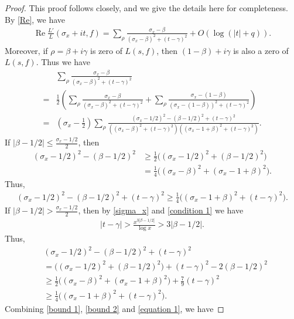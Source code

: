 \documentclass[11pt,reqno]{amsart}
\newcommand{\bea}{\begin{eqnarray}}
\newcommand{\eea}{\end{eqnarray}}
\newcommand{\bna}{\begin{eqnarray*}}
\newcommand{\ena}{\end{eqnarray*}}
\numberwithin{equation}{section}
\theoremstyle{plain}
\theoremstyle{definition}
\renewcommand{\Re}{\operatorname{Re}}
\begin{document}
\begin{proof}
This proof follows \cite[Lemma 4.3]{LS} closely, and we give the details here for completeness.
By \eqref{Re}, we have
\bea\label{Re sigma_x}
\Re\frac{L'}{L}(\sigma_x+it,f)=\sum_\rho\frac{\sigma_x-\beta}{(\sigma_x-\beta)^2+(t-\gamma)^2}+O(\log(|t|+q)).
\eea
Moreover, if $\rho=\beta+i\gamma$ is zero of $L(s,f)$, then $(1-\beta)+i\gamma$ is also a zero of $L(s,f)$.
Thus we have
\begin{equation}\label{equation 1}
\begin{split}
&\sum_\rho\frac{\sigma_x-\beta}{(\sigma_x-\beta)^2+(t-\gamma)^2}\\
=&\frac{1}{2}\left(\sum_\rho\frac{\sigma_x-\beta}{(\sigma_x-\beta)^2+(t-\gamma)^2}
+\sum_\rho\frac{\sigma_x-(1-\beta)}{(\sigma_x-(1-\beta))^2+(t-\gamma)^2}\right)\\
=&\left(\sigma_x-\frac{1}{2}\right)\sum_\rho\frac{(\sigma_x-1/2)^2-(\beta-1/2)^2+(t-\gamma)^2}
{((\sigma_x-\beta)^2+(t-\gamma)^2)((\sigma_x-1+\beta)^2+(t-\gamma)^2)}.
\end{split}
\end{equation}
If $|\beta-1/2|\leq \frac{\sigma_x-1/2}{2}$, then
\begin{equation*}
\begin{split}
(\sigma_x-1/2)^2-(\beta-1/2)^2&\geq \frac{1}{2}\big((\sigma_x-1/2)^2+(\beta-1/2)^2\big)\\
&=\frac{1}{4}\big((\sigma_x-\beta)^2+(\sigma_x-1+\beta)^2\big).
\end{split}
\end{equation*}
Thus,
\bea\label{bound 1}
(\sigma_x-1/2)^2-(\beta-1/2)^2+(t-\gamma)^2\geq\frac{1}{4}\big((\sigma_x-1+\beta)^2+(t-\gamma)^2\big).
\eea
If $|\beta-1/2|> \frac{\sigma_x-1/2}{2}$, then by \eqref{sigma_x} and \eqref{condition 1} we have
\bna
|t-\gamma|>\frac{x^{3|\beta-1/2|}}{\log x}>3|\beta-1/2|.
\ena
Thus,
\begin{equation}\label{bound 2}
\begin{split}
&(\sigma_x-1/2)^2-(\beta-1/2)^2+(t-\gamma)^2\\
&=\big((\sigma_x-1/2)^2+(\beta-1/2)^2\big)+(t-\gamma)^2-2(\beta-1/2)^2\\
&\geq\frac{1}{2}\big((\sigma_x-\beta)^2+(\sigma_x-1+\beta)^2\big)+\frac{7}{9}(t-\gamma)^2\\
&\geq\frac{1}{4}\big((\sigma_x-1+\beta)^2+(t-\gamma)^2\big).
\end{split}
\end{equation}
Combining \eqref{bound 1}, \eqref{bound 2} and \eqref{equation 1}, we have

\end{proof}
\end{document}
